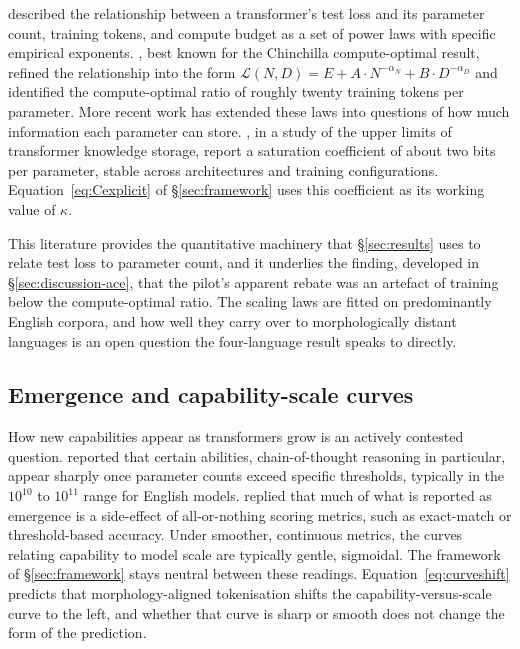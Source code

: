 \citet{kaplan2020} described the relationship between a transformer's test loss and its parameter count, training tokens, and compute budget as a set of power laws with specific empirical exponents. \citet{hoffmann2022}, best known for the Chinchilla compute-optimal result, refined the relationship into the form $\mathcal{L}(N, D) = E + A \cdot N^{-\alpha_N} + B \cdot D^{-\alpha_D}$ and identified the compute-optimal ratio of roughly twenty training tokens per parameter. More recent work has extended these laws into questions of how much information each parameter can store. \citet{allenzhu2024}, in a study of the upper limits of transformer knowledge storage, report a saturation coefficient of about two bits per parameter, stable across architectures and training configurations. Equation~\ref{eq:Cexplicit} of \S\ref{sec:framework} uses this coefficient as its working value of $\kappa$.

This literature provides the quantitative machinery that \S\ref{sec:results} uses to relate test loss to parameter count, and it underlies the finding, developed in \S\ref{sec:discussion-ace}, that the pilot's apparent rebate was an artefact of training below the compute-optimal ratio. The scaling laws are fitted on predominantly English corpora, and how well they carry over to morphologically distant languages is an open question the four-language result speaks to directly.

\subsection{Emergence and capability-scale curves}
\label{sec:related-emergence}

How new capabilities appear as transformers grow is an actively contested question. \citet{wei2022} reported that certain abilities, chain-of-thought reasoning in particular, appear sharply once parameter counts exceed specific thresholds, typically in the $10^{10}$ to $10^{11}$ range for English models. \citet{schaeffer2023} replied that much of what is reported as emergence is a side-effect of all-or-nothing scoring metrics, such as exact-match or threshold-based accuracy. Under smoother, continuous metrics, the curves relating capability to model scale are typically gentle, sigmoidal. The framework of \S\ref{sec:framework} stays neutral between these readings. Equation~\ref{eq:curveshift} predicts that morphology-aligned tokenisation shifts the capability-versus-scale curve to the left, and whether that curve is sharp or smooth does not change the form of the prediction.

